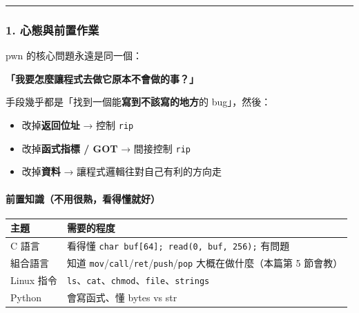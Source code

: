 \documentclass[10pt,a4paper]{article}
\newcounter{none}
\providecommand{\tightlist}{%
  \setlength{\itemsep}{0pt}\setlength{\parskip}{0pt}}
\renewenvironment{quote}{%
  \begin{mdframed}[linewidth=0pt,innerleftmargin=0pt,innerrightmargin=0pt,
    innerbottommargin=0pt,innertopmargin=0pt,skipabove=0.55em,skipbelow=0.55em,
    leftmargin=0.9em,rightmargin=0.4em,startcode={\color{quotebar}\vrule width 2.6pt},%
    endcode={}]%
  \itshape\color{black}%
}{%
  \end{mdframed}%
}
\begin{document}
\begin{center}\rule{0.5\linewidth}{0.5pt}\end{center}

\subsubsection{1.
心態與前置作業}\label{ux5fc3ux614bux8207ux524dux7f6eux4f5cux696d}

pwn 的核心問題永遠是同一個：

\begin{quote}
\textbf{「我要怎麼讓程式去做它原本不會做的事？」}
\end{quote}

手段幾乎都是「找到一個能\textbf{寫到不該寫的地方}的 bug」，然後：

\begin{itemize}
\tightlist
\item
  改掉\textbf{返回位址} → 控制 \texttt{rip}
\item
  改掉\textbf{函式指標 / GOT} → 間接控制 \texttt{rip}
\item
  改掉\textbf{資料} → 讓程式邏輯往對自己有利的方向走
\end{itemize}

\paragraph{前置知識（不用很熟，看得懂就好）}\label{ux524dux7f6eux77e5ux8b58ux4e0dux7528ux5f88ux719fux770bux5f97ux61c2ux5c31ux597d}

{\def\LTcaptype{none} %
\begin{longtable}[]{@{}
  >{\raggedright\arraybackslash}p{}
  >{\raggedright\arraybackslash}p{}@{}}
\toprule\noalign{}
\begin{minipage}[b]{\linewidth}\raggedright
主題
\end{minipage} & \begin{minipage}[b]{\linewidth}\raggedright
需要的程度
\end{minipage} \\
\midrule\noalign{}
\endhead
\bottomrule\noalign{}
\endlastfoot
C 語言 & 看得懂 \texttt{char\ \allowbreak{}buf{[}64{]};\ \allowbreak{}read(0,\allowbreak{}\ \allowbreak{}buf,\allowbreak{}\ \allowbreak{}256);}
有問題 \\
組合語言 & 知道
\texttt{mov}/\texttt{call}/\texttt{ret}/\texttt{push}/\texttt{pop}
大概在做什麼（本篇第 5 節會教） \\
Linux 指令 &
\texttt{ls}、\texttt{cat}、\texttt{chmod}、\texttt{file}、\texttt{strings} \\
Python & 會寫函式、懂 bytes vs str \\
\end{longtable}
}
\end{document}
